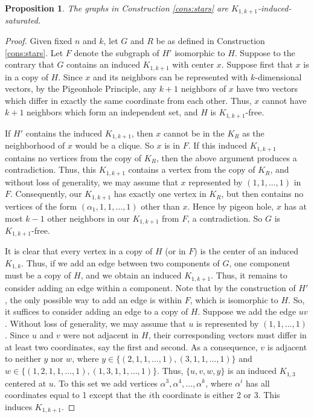 \documentclass[12pt]{amsart}
\theoremstyle{plain}
\newtheorem{prop}[thm]{Proposition}
\theoremstyle{definition}
\theoremstyle{remark}
\begin{document}
\begin{prop}\label{prop:stars2}
The graphs in Construction \ref{cons:stars} are $K_{1,k+1}$-induced-saturated.
\end{prop}
\begin{proof}
Given fixed $n$ and $k$, let $G$ and $R$ be as defined in Construction \ref{cons:stars}.  Let $F$ denote the subgraph of $H'$ isomorphic to $H$.   Suppose to the contrary that $G$ contains an induced $K_{1,k+1}$ with center $x$.  Suppose first that $x$ is in a copy of $H$.  Since $x$ and its neighbors can be represented with $k$-dimensional vectors, by the Pigeonhole Principle, any $k+1$ neighbors of $x$ have two vectors which differ in exactly the same coordinate from each other.  Thus, $x$ cannot have $k+1$ neighbors which form an independent set, and $H$ is $K_{1,k+1}$-free.

If $H'$ contains the induced $K_{1,k+1}$, then $x$ cannot be in the $K_R$ as the neighborhood of $x$ would be a clique.  So $x$ is in $F$.  If this induced $K_{1,k+1}$ contains no vertices from the copy of $K_R$, then the above argument produces  a contradiction.  Thus, this $K_{1,k+1}$ contains a vertex from the copy of $K_R$, and without loss of generality, we may assume that $x$ represented by $(1,1,\dots,1)$ in $F$.  Consequently, our $K_{1,k+1}$ has exactly one vertex in $K_R$, but then contains no vertices of the form $(\alpha_1,1,1,\dots,1)$ other than $x$.  Hence by pigeon hole, $x$ has at most $k-1$ other neighbors in our $K_{1,k+1}$ from $F$, a contradiction.   So $G$ is $K_{1,k+1}$-free.

It is clear that every vertex in a copy of $H$ (or in $F$) is the center of an induced $K_{1,k}$.  Thus, if we add an edge between two components of $G$, one component must be a copy of $H$, and we obtain an induced $K_{1,k+1}$.  Thus, it remains to consider adding an edge within a component.  Note that by the construction of $H'$, the only possible way to add an edge is within $F$, which is isomorphic to $H$.  So, it suffices to consider adding an edge to a copy of $H$.  Suppose we add the edge $uv$.  Without loss of generality, we may assume that $u$ is represented by $(1,1,\dots, 1)$.  Since $u$ and $v$ were not adjacent in $H$, their corresponding vectors must differ in at least two coordinates, say the first and second.  As a consequence, $v$ is adjacent to neither $y$ nor $w$, where $y \in \{(2,1,1,\dots,1), (3,1,1,\dots,1)\}$ and $w \in \{(1,2,1,1,\dots,1), (1,3,1,1,\dots,1)\}$.  Thus, $\{u,v,w,y\}$ is an induced $K_{1,3}$ centered at $u$.  To this set we add vertices $\alpha^3,\alpha^4,\dots, \alpha^k$, where $\alpha^i$ has all coordinates equal to 1 except that the $i$th coordinate is either 2 or 3.  This induces $K_{1,k+1}$.


\end{proof}
\end{document}
